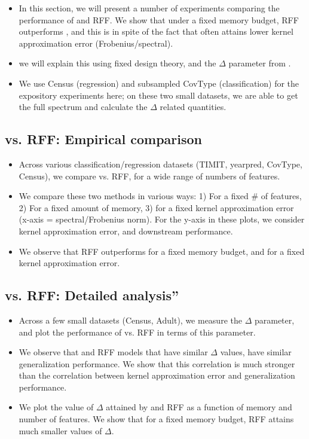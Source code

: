 \begin{itemize}
	\item In this section, we will present a number of experiments comparing the performance of \Nystrom and RFF.  We show that under a fixed memory budget, RFF outperforms \NystromNS, and this is in spite of the fact that \Nystrom often attains lower kernel approximation error (Frobenius/spectral).
	\item we will explain this using fixed design theory, and the $\Delta$ parameter from \citep{avron17}. 
	\item We use Census (regression) and subsampled CovType (classification) for the expository experiments here; on these two small datasets, we are able to get the full spectrum and calculate the $\Delta$ related quantities.
\end{itemize}

\subsection{\Nystrom vs. RFF: Empirical comparison}
\begin{itemize}
	\item Across various classification/regression datasets (TIMIT, yearpred, CovType, Census), we compare \Nystrom vs. RFF, for a wide range of numbers of features.
	\item We compare these two methods in various ways: 1) For a fixed \# of features, 2) For a fixed amount of memory, 3) for a fixed kernel approximation error (x-axis = spectral/Frobenius norm).  For the y-axis in these plots, we consider kernel approximation error, and downstream performance.
	\item We observe that RFF outperforms \Nystrom for a fixed memory budget, and for a fixed kernel approximation error.
\end{itemize}

\subsection{\Nystrom vs. RFF: Detailed analysis''}
\begin{itemize}
	\item Across a few small datasets (Census, Adult), we measure the $\Delta$ parameter, and plot the performance of \Nystrom vs. RFF in terms of this parameter.
	\item We observe that \Nystrom and RFF models that have similar $\Delta$ values, have similar generalization performance.  We show that this correlation is much stronger than the correlation between kernel approximation error and generalization performance.
	\item We plot the value of $\Delta$ attained by \Nystrom and RFF as a function of memory and number of features.  We show that for a fixed memory budget, RFF attains much smaller values of $\Delta$.
\end{itemize}